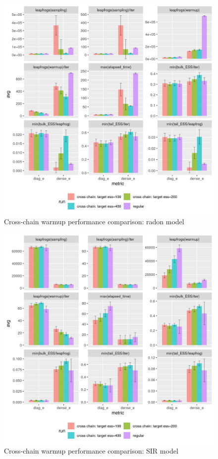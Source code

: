 \documentclass[11pt, reqno, oneside]{amsart}
\begin{document}
\begin{figure}[htbp]
\centering
\includegraphics[width=\textwidth]{./figure/cross_chain_ess_effect_radon.png}
\caption{Cross-chain warmup performance comparison: radon model}
\end{figure}

\begin{figure}[htbp]
\centering
\includegraphics[width=\textwidth]{./figure/cross_chain_ess_effect_sir.png}
\caption{Cross-chain warmup performance comparison: SIR model}
\end{figure}
\end{document}
